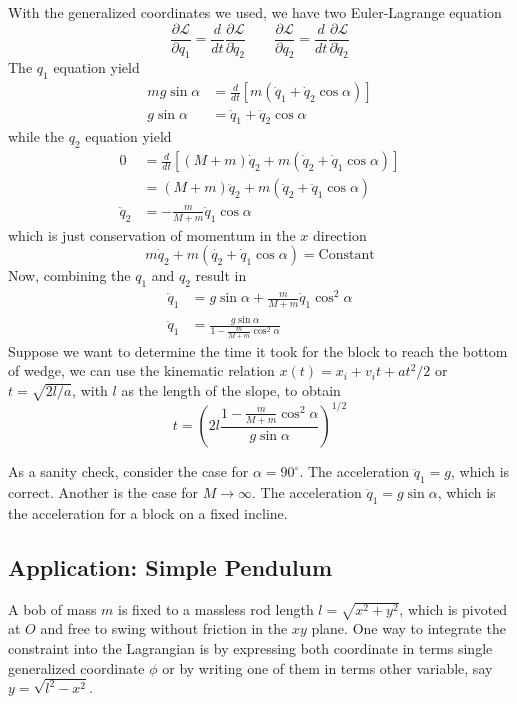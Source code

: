 \documentclass[../../../main.tex]{subfiles}
\begin{document}
With the generalized coordinates we used, we have two Euler-Lagrange equation
\begin{equation*}
	\frac{\partial \mathcal{L}}{\partial q_1}=\frac{d}{dt}\frac{\partial \mathcal{L}}{\partial \dot{q}_2}\qquad\frac{\partial \mathcal{L}}{\partial q_2}=\frac{d}{dt}\frac{\partial \mathcal{L}}{\partial \dot{q}_2}
\end{equation*}
The $q_1$ equation yield
\begin{align*}
	mg\sin\alpha & =\frac{d}{dt}\left[m(\dot{q}_1+\dot{q}_2\cos\alpha)\right] \\
	g\sin\alpha  & =\ddot{q}_1+\ddot{q}_2\cos\alpha
\end{align*}
while the $q_2$ equation yield
\begin{align*}
	0          & =\frac{d}{dt}\left[(M+m)\dot{q}_2+m(\dot{q}_2+\dot{q}_1\cos\alpha)\right] \\
	           & =(M+m)\ddot{q}_2+m(\ddot{q}_2+\ddot{q}_1\cos\alpha)                       \\
	\ddot{q}_2 & =-\frac{m}{M+m}\ddot{q}_1\cos\alpha
\end{align*}
which is just conservation of momentum in the $x$ direction
\begin{equation*}
	m\dot{q}_2+m\left(\dot{q_2}+\dot{q}_1\cos\alpha\right)=\text{Constant}
\end{equation*}
Now, combining the $q_1$ and $q_2$ result in
\begin{align*}
	\ddot{q}_1 & =g\sin\alpha+\frac{m}{M+m}\ddot{q}_1\cos^2\alpha \\
	\ddot{q}_1 & =\frac{g\sin\alpha}{1-\frac{m}{M+m}\cos^2\alpha}
\end{align*}
Suppose we want to determine the time it took for the block to reach the bottom of wedge, we can use the kinematic relation $x(t)=x_i+v_it+at^2/2$ or $t=\sqrt{2l/a}$, with $l$ as the length of the slope, to obtain
\begin{equation*}
	t=\left(2l\frac{1-\frac{m}{M+m}\cos^2\alpha}{g\sin\alpha}\right)^{1/2}
\end{equation*}

As a sanity check, consider the case for $\alpha=90^\circ$.
The acceleration $\ddot{q}_1=g$, which is correct.
Another is the case for $M\rightarrow\infty$.
The acceleration $\ddot{q}_1=g\sin\alpha$, which is the acceleration for a block on a fixed incline.


\subsection*{Application: Simple Pendulum}
A bob of mass $m$ is fixed to a massless rod length $l=\sqrt{x^2+y^2}$, which is pivoted at $O$ and free to swing without friction in the $xy$ plane.
One way to integrate the constraint into the Lagrangian is by expressing both coordinate in terms single generalized coordinate $\phi$ or by writing one of them in terms other variable, say  $y=\sqrt{l^2-x^2}$.
\end{document}
